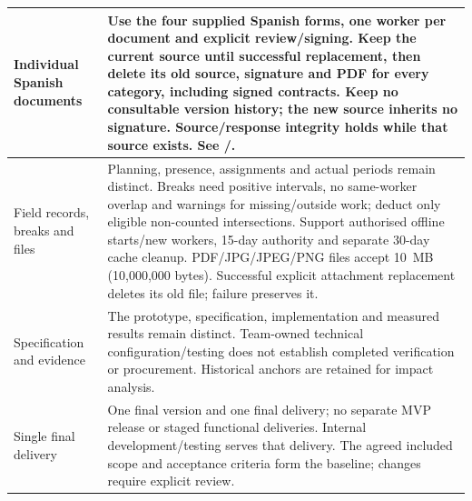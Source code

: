 {\begin{longtable}{L{0.24}L{0.76}}
\midrule
{}\label{decision:D-07}\label{decision:D-14}\label{decision:Q-DOC-01}\label{decision:Q-DOC-02}\label{decision:Q-DOC-03}Individual Spanish documents & Use the four supplied Spanish forms, one worker per document and explicit review/signing. Keep the current source until successful replacement, then delete its old source, signature and PDF for every category, including signed contracts. Keep no consultable version history; the new source inherits no signature. Source/response integrity holds while that source exists. See /. \\
\midrule
{}\label{decision:D-15}\label{decision:Q-OFF-01}\label{decision:Q-OFF-02}\label{decision:Q-IN-02}\label{decision:D-17}\label{decision:Q-WF-01}\label{decision:Q-WF-02}\label{decision:D-19}\label{decision:D-20}\label{decision:D-22}\label{decision:D-25}\label{decision:D-26}\label{decision:D-27}\label{decision:D-28}\label{decision:Q-WF-03}\label{decision:Q-DOC-06}\label{decision:Q-AT-02}Field records, breaks and files & Planning, presence, assignments and actual periods remain distinct. Breaks need positive intervals, no same-worker overlap and warnings for missing/outside work; deduct only eligible non-counted intersections. Support authorised offline starts/new workers, 15-day authority and separate 30-day cache cleanup. PDF/JPG/JPEG/PNG files accept 10~MB (10,000,000 bytes). Successful explicit attachment replacement deletes its old file; failure preserves it. \\
\midrule
{}\label{decision:D-18}\label{decision:Q-UI-01}\label{decision:D-29}\label{decision:D-31}\label{decision:D-32}\label{decision:D-33}\label{decision:D-34}Specification and evidence & The prototype, specification, implementation and measured results remain distinct. Team-owned technical configuration/testing does not establish completed verification or procurement. Historical anchors are retained for impact analysis. \\
\midrule
{}\label{decision:Q-SCOPE-01}Single final delivery & One final version and one final delivery; no separate MVP release or staged functional deliveries. Internal development/testing serves that delivery. The agreed included scope and acceptance criteria form the baseline; changes require explicit review. \\

\end{longtable}}

